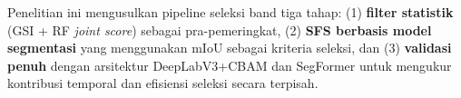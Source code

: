 Penelitian ini mengusulkan pipeline seleksi band tiga tahap: (1) \textbf{filter statistik} (GSI + RF \textit{joint score}) sebagai pra-pemeringkat, (2) \textbf{SFS berbasis model segmentasi} yang menggunakan mIoU sebagai kriteria seleksi, dan (3) \textbf{validasi penuh} dengan arsitektur DeepLabV3+CBAM dan SegFormer untuk mengukur kontribusi temporal dan efisiensi seleksi secara terpisah.

